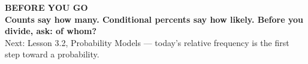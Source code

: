 \documentclass[aspectratio=169, 11pt]{beamer}
\begin{document}
{
\begin{frame}[plain]
  \vspace{1.5cm}\hspace{0.8cm}%
  \begin{minipage}{0.86\textwidth}
    {\color{goldacc}\bfseries\small BEFORE YOU GO}\\[0.7cm]
    {\color{white}\bfseries\Large Counts say how many. Conditional percents say how likely.
    Before you divide, ask: of whom?}\\[0.9cm]
    {\color{frostmid}\small Next: Lesson 3.2, Probability Models --- today's relative frequency
    is the first step toward a probability.}
  \end{minipage}
\end{frame}
}
\end{document}
